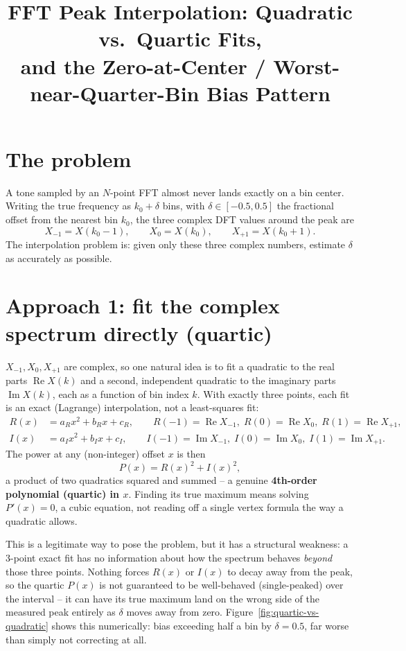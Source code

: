 \documentclass[11pt]{article}
\title{FFT Peak Interpolation: Quadratic vs.\ Quartic Fits,\\
and the Zero-at-Center / Worst-near-Quarter-Bin Bias Pattern}
\author{}
\date{}
\begin{document}
\maketitle

\section{The problem}

A tone sampled by an $N$-point FFT almost never lands exactly on a bin
center. Writing the true frequency as $k_0 + \delta$ bins, with
$\delta \in [-0.5, 0.5]$ the fractional offset from the nearest bin
$k_0$, the three complex DFT values around the peak are
\begin{equation}
  X_{-1} = X(k_0-1), \qquad X_0 = X(k_0), \qquad X_{+1} = X(k_0+1).
\end{equation}
The interpolation problem is: given only these three complex numbers,
estimate $\delta$ as accurately as possible.

\section{Approach 1: fit the complex spectrum directly (quartic)}

$X_{-1}, X_0, X_{+1}$ are complex, so one natural idea is to fit a
quadratic to the real parts $\operatorname{Re}X(k)$ and a second,
independent quadratic to the imaginary parts $\operatorname{Im}X(k)$,
each as a function of bin index $k$. With exactly three points, each
fit is an exact (Lagrange) interpolation, not a least-squares fit:
\begin{align}
  R(x) &= a_R x^2 + b_R x + c_R, \qquad R(-1)=\operatorname{Re}X_{-1},\;
         R(0)=\operatorname{Re}X_0,\; R(1)=\operatorname{Re}X_{+1},\\
  I(x) &= a_I x^2 + b_I x + c_I, \qquad I(-1)=\operatorname{Im}X_{-1},\;
         I(0)=\operatorname{Im}X_0,\; I(1)=\operatorname{Im}X_{+1}.
\end{align}
The power at any (non-integer) offset $x$ is then
\begin{equation}
  P(x) = R(x)^2 + I(x)^2,
\end{equation}
a product of two quadratics squared and summed -- a genuine
\textbf{4th-order polynomial (quartic) in $x$}. Finding its true
maximum means solving $P'(x)=0$, a cubic equation, not reading off a
single vertex formula the way a quadratic allows.

This is a legitimate way to pose the problem, but it has a structural
weakness: a 3-point exact fit has no information about how the
spectrum behaves \emph{beyond} those three points. Nothing forces
$R(x)$ or $I(x)$ to decay away from the peak, so the quartic
$P(x)$ is not guaranteed to be well-behaved (single-peaked) over the
interval -- it can have its true maximum land on the wrong side of
the measured peak entirely as $\delta$ moves away from zero.
Figure~\ref{fig:quartic-vs-quadratic} shows this numerically: bias
exceeding half a bin by $\delta=0.5$, far worse than simply not
correcting at all.
\end{document}
